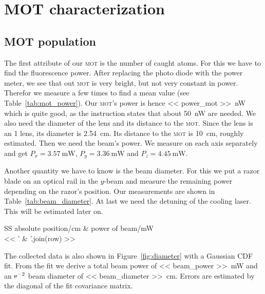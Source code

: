 \documentclass[11pt, english, fleqn, DIV=15, headinclude, BCOR=2cm]{scrreprt}
\newcommand\mot{\textsc{mot}}
\begin{document}
\section{MOT characterization}

\subsection{MOT population}


The first attribute of our \mot{} is the number of caught atoms. For this we
have to find the fluorescence power. After replacing the photo diode with the
power meter, we see that out \mot{} is very bright, but not very constant in
power.  Therefor we measure a few times to find a mean value (see
Table~\ref{tab:mot_power}). Our \mot's power is hence \SI{<< power_mot
>>}{\nano\watt} which is quite good, as the instruction states that about
\SI{50}{\nano\watt} are needed. We also need the diameter of the lens and its
distance to the \mot. Since the lens is an \SI{1}{\inch} lens, its diameter is
\SI{2.54}{\centi\meter}. Its distance to the \mot{} is \SI{10}{\centi\meter},
roughly estimated. Then we need the beam's power. We measure on each axis
separately and get $P_x = \SI{3.57}{\milli\watt}$, $P_y =
\SI{3.36}{\milli\watt}$ and $P_z = \SI{4.45}{\milli\watt}$.

Another quantity we have to know is the beam diameter. For this we put a razor
blade on an optical rail in the $y$-beam and measure the remaining power
depending on the razor's position. Our measurements are shown in
Table~\ref{tab:beam_diameter}. At last we need the detuning of the cooling
laser. This will be estimated later on.

\begin{table}
    \centering
    \begin{tabular}{SS}
        \toprule
        {absolute position/\si{\centi\meter}}
        & {power of beam/\si{\milli\watt}} \\
        \midrule
        << ' & '.join(row) >> \\
        \bottomrule
    \end{tabular}
    \caption{%
        Measurement to estimate the beam diameter.
    }
    \label{tab:beam_diameter}
\end{table}

The collected data is also shown in Figure~\ref{fig:diameter} with a Gaussian
CDF fit. From the fit we derive a total beam power of \SI{<< beam_power
>>}{\milli\watt} and an $\mathrm e^{-2}$ beam diameter of \SI{<< beam_diameter
>>}{\centi\meter}. Errors are estimated by the diagonal of the fit covariance
matrix.
\end{document}
